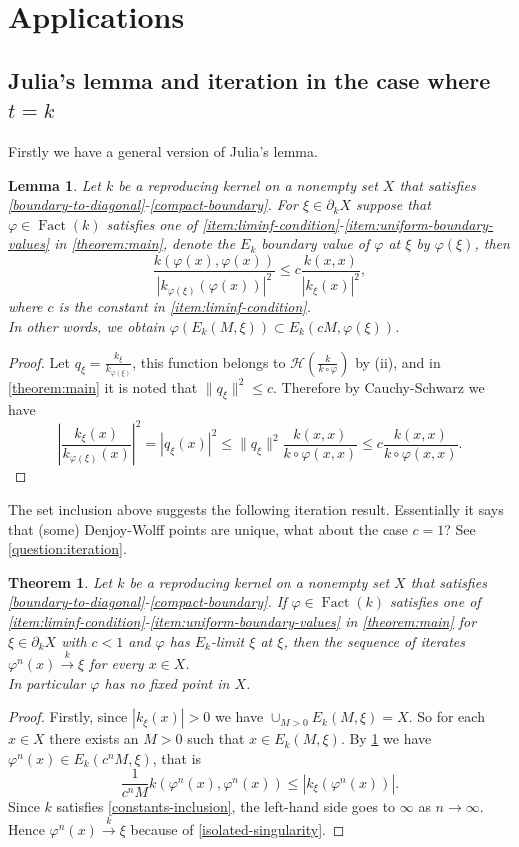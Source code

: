 \documentclass[leqno, final]{article}
\newtheorem{lemma}{Lemma}
\newtheorem{theorem}{Theorem}
\theoremstyle{definition}
\newcommand{\xto}[1]{\stackrel{#1}{\to}}
\newcommand{\Hilbert}{\mathcal{H}}
\newcommand{\rand}{\partial}
\renewcommand{\phi}{\varphi}
\DeclareMathOperator{\Fact}{Fact}
\begin{document}
\section{Applications}

\subsection{Julia's lemma and iteration in the case where $t = k$}\label{section:iteration}
Firstly we have a general version of Julia's lemma.
\begin{lemma}\label{lemma:julia}
Let $k$ be a reproducing kernel on a nonempty set $X$ that satisfies
\ref{boundary-to-diagonal}-\ref{compact-boundary}. For $\xi\in\rand_kX$
suppose that $\phi\in\Fact(k)$ satisfies one of
\ref{item:liminf-condition}-\ref{item:uniform-boundary-values} in \cref{theorem:main},
denote the $E_k$ boundary value of $\phi$ at $\xi$ by $\phi(\xi)$, then \begin{equation}
	\frac{k(\phi(x),\phi(x))}{|k_{\phi(\xi)}(\phi(x))|^2}
	\leq c\frac{k(x,x)}{|k_\xi(x)|^2},
\end{equation}
where $c$ is the constant in \ref{item:liminf-condition}.
\\ In other words, we obtain $\phi(E_k(M,\xi)) \subset E_k(cM,\phi(\xi))$.
\end{lemma}
\begin{proof}
Let $q_\xi = \frac{k_\xi}{k_{\phi(\xi)}}$, this function belongs to $\Hilbert(\frac{k}{k\circ\phi})$
by (ii), and in \cref{theorem:main} it is noted that
$\|q_\xi\|^2\leq c$. Therefore by Cauchy-Schwarz we have \[
	\left|\frac{k_\xi(x)}{k_{\phi(\xi)}(x)}\right|^2
	= |q_\xi(x)|^2
	\leq \|q_\xi\|^2\frac{k(x,x)}{k\circ\phi(x,x)}
	\leq c\frac{k(x,x)}{k\circ\phi(x,x)}.
\]
\end{proof}

The set inclusion above suggests the following iteration result. Essentially it
says that (some) Denjoy-Wolff points are unique, what about the case $c=1$?
See \cref{question:iteration}.
\begin{theorem}\label{theorem:iteration}
Let $k$ be a reproducing kernel on a nonempty set $X$ that satisfies
\ref{boundary-to-diagonal}-\ref{compact-boundary}.
If $\phi\in\Fact(k)$ satisfies one of
\ref{item:liminf-condition}-\ref{item:uniform-boundary-values} in \cref{theorem:main}
for $\xi\in\rand_kX$ with $c < 1$ and $\phi$ has $E_k$-limit $\xi$ at $\xi$, then the sequence of
iterates $\phi^n(x)\xto{k}\xi$ for every $x\in X$.
\\ In particular $\phi$ has no fixed point in $X$.
\end{theorem}
\begin{proof}
Firstly, since $|k_\xi(x)|>0$ we have $\cup_{M>0}E_k(M,\xi)=X$. So for each $x\in X$
there exists an $M>0$ such that $x\in E_k(M,\xi)$. By \cref{lemma:julia} we have
$\phi^n(x)\in E_k(c^nM,\xi)$, that is \[
	\frac1{c^nM}k(\phi^n(x),\phi^n(x)) \leq |k_\xi(\phi^n(x))|.
\]
Since $k$ satisfies \ref{constants-inclusion}, the left-hand side goes to $\infty$
as $n\to\infty$. Hence $\phi^n(x)\xto{k}\xi$ because of \ref{isolated-singularity}.
\end{proof}
\end{document}
